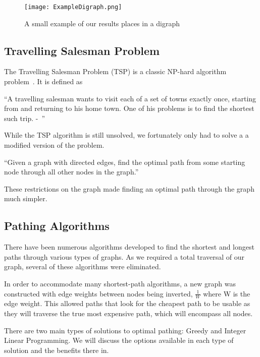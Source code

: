 \documentclass[bsc,frontabs,twoside,singlespacing,parskip,deptreport]{infthesis}     %
\begin{document}
\begin{figure}
  \centering
  \texttt{[image: ExampleDigraph.png]}
  \caption{A small example of our results places in a digraph}
  \label{fig:digraph}
 \end{figure}

\subsection{Travelling Salesman Problem}
The Travelling Salesman Problem (TSP) is a classic NP-hard algorithm problem~\cite{junger1995traveling}.%
It is defined as
\begin{center}
\enquote{A travelling salesman wants to visit each of a set of towns exactly once, starting
from and returning to his home town. One of his problems is to find the shortest
such trip. -~\cite{junger1995traveling}}
\end{center}

While the TSP algorithm is still unsolved, we fortunately only had to solve a a modified version of the problem.\\

\begin{center}
  \enquote{Given a graph with directed edges, find the optimal path from some starting node through all other nodes in
  the graph.}
\end{center}

These restrictions on the graph made finding an optimal path through the graph much simpler.


\subsection{Pathing Algorithms}
There have been numerous algorithms developed to find the shortest and longest paths through various types of graphs.
As we required a total traversal of our graph, several of these algorithms were eliminated.

In order to accommodate many shortest-path algorithms, a new graph was constructed with edge weights between nodes being inverted,
$\frac{1}{W}$ where W is the edge weight. This allowed paths that look for the cheapest path to be usable as they will traverse the
true most expensive path, which will encompass all nodes.

There are two main types of solutions to optimal pathing: Greedy and Integer Linear Programming.
We will discuss the options available in each type of solution and the benefits there in.
\end{document}

